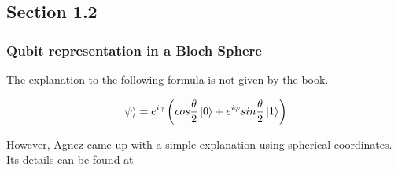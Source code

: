 \subsection{Section 1.2}
\subsubsection{Qubit representation in a Bloch Sphere}

The explanation to the following formula is not given by the book.

\[
\ket{\psi} = e^{i \gamma} \left(
    cos \frac{\theta}{2}\ket{0} + e^{i \varphi} sin \frac{\theta}{2} \ket{1}
\right)
\]

However, \href{https://github.com/victoragnez}{Agnez} came up with a simple explanation using spherical coordinates. Its details can be found at 